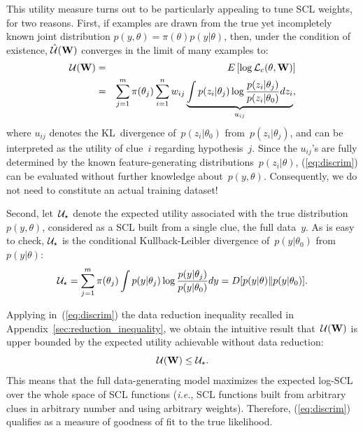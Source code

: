 \documentclass[english]{scrartcl}
\begin{document}
This utility measure turns out to be particularly appealing to tune SCL weights, for two reasons. First, if examples are drawn from the true yet incompletely known joint distribution $p(y,\theta)=\pi(\theta)p(y|\theta)$, then, under the condition of existence, $\hat{\cal U}(\mathbf{W})$ converges in the limit of many examples to:
\begin{eqnarray}
{\cal U}(\mathbf{W})
& = & 
E\left[
\log {\cal L}_c(\theta, \mathbf{W})
\right] \nonumber \\
& = & 
\sum_{j=1}^m \pi(\theta_j) \sum_{i=1}^n w_{ij} 
\underbrace{\int p(z_i|\theta_j) \log \frac{p(z_i|\theta_j)}{p(z_i|\theta_0)} dz_i}_{u_{ij}},
\label{eq:discrim}
\end{eqnarray}
where $u_{ij}$ denotes the KL~divergence of~$p(z_i|\theta_0)$ from~$p(z_i|\theta_j)$, and can be interpreted as the utility of clue~$i$ regarding hypothesis~$j$. Since the $u_{ij}$'s are fully determined by the known feature-generating distributions~$p(z_i|\theta)$, (\ref{eq:discrim}) can be evaluated without further knowledge about~$p(y,\theta)$. Consequently, we do not need to constitute an actual training dataset! 

Second, let~${\cal U}_\star$ denote the expected utility associated with the true distribution~$p(y,\theta)$, considered as a SCL built from a single clue, the full data~$y$. As is easy to check, ${\cal U}_\star$ is the conditional Kullback-Leibler divergence of~$p(y|\theta_0)$ from~$p(y|\theta)$:
$$
{\cal U}_\star
= \sum_{j=1}^m \pi(\theta_j) \int p(y|\theta_j) \log \frac{p(y|\theta_j)}{p(y|\theta_0)} dy
= D[p(y|\theta)\|p(y|\theta_0)]
.
$$

Applying in~(\ref{eq:discrim}) the data reduction inequality recalled in Appendix~\ref{sec:reduction_inequality}, we obtain the intuitive result that~${\cal U}(\mathbf{W})$ is upper bounded by the expected utility achievable without data reduction: 
$$
{\cal U}(\mathbf{W})\leq {\cal U}_\star
.
$$
This means that the full data-generating model maximizes the expected log-SCL over the whole space of SCL functions ({\em i.e.}, SCL functions built from arbitrary clues in arbitrary number and using arbitrary weights). Therefore, (\ref{eq:discrim}) qualifies as a measure of goodness of fit to the true likelihood. 
\end{document}
